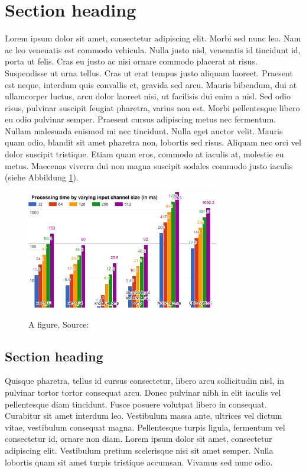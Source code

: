 \section{Section heading}
Lorem ipsum dolor sit amet, consectetur adipiscing elit. Morbi sed nunc leo. Nam ac leo venenatis est commodo vehicula. Nulla justo nisl, venenatis id tincidunt id, porta ut felis. Cras eu justo ac nisi ornare commodo placerat at risus. Suspendisse ut urna tellus. Cras ut erat tempus justo aliquam laoreet. Praesent est neque, interdum quis convallis et, gravida sed arcu. Mauris bibendum, dui at ullamcorper luctus, arcu dolor laoreet nisi, ut facilisis dui enim a nisl. Sed odio risus, pulvinar suscipit feugiat pharetra, varius non est. Morbi pellentesque libero eu odio pulvinar semper. Praesent cursus adipiscing metus nec fermentum. Nullam malesuada euismod mi nec tincidunt. Nulla eget auctor velit. Mauris quam odio, blandit sit amet pharetra non, lobortis sed risus. Aliquam nec orci vel dolor suscipit tristique. Etiam quam eros, commodo at iaculis at, molestie eu metus. Maecenas viverra dui non magna suscipit sodales commodo justo iaculis (siehe Abbildung \ref{fig:test}).

\begin{figure}[hbp]
\begin{center}
\includegraphics*[width=0.75\textwidth]{example.png}\\
\caption{A figure, Source: \cite{caicedo2015active}}
\label{fig:test}
\end{center}
\end{figure}

\subsection{Section heading}
Quisque pharetra, tellus id cursus consectetur, libero arcu sollicitudin nisl, in pulvinar tortor tortor consequat arcu. Donec pulvinar nibh in elit iaculis vel pellentesque diam tincidunt. Fusce posuere volutpat libero in consequat. Curabitur sit amet interdum leo. Vestibulum massa ante, ultrices vel dictum vitae, vestibulum consequat magna. Pellentesque turpis ligula, fermentum vel consectetur id, ornare non diam. Lorem ipsum dolor sit amet, consectetur adipiscing elit. Vestibulum pretium scelerisque nisi sit amet semper. Nulla lobortis quam sit amet turpis tristique accumsan. Vivamus sed nunc odio.

